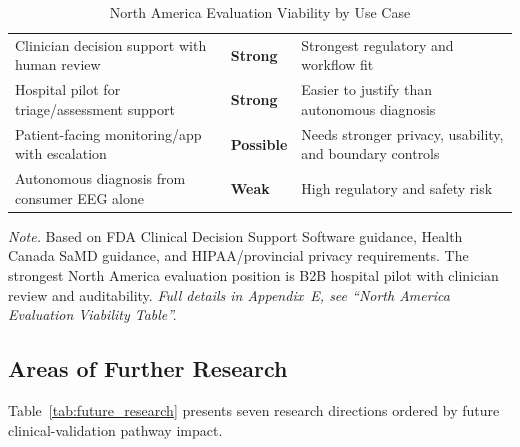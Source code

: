 {\tablestripes\tablefontsize
\begin{xltabular}{\textwidth}{@{} L l L @{}}
\caption[North America Evaluation Viability by Use Case]{North America Evaluation Viability by Use Case}\label{tab:na_deployment_viability} \\
\toprule
{} &  &  \\
\midrule
\endfirsthead
\endhead
\bottomrule
\endlastfoot
Clinician decision support with human review & \textbf{Strong} & Strongest regulatory and workflow fit \\
Hospital pilot for triage/assessment support & \textbf{Strong} & Easier to justify than autonomous diagnosis \\
Patient-facing monitoring/app with escalation & \textbf{Possible} & Needs stronger privacy, usability, and boundary controls \\
Autonomous diagnosis from consumer EEG alone & \textbf{Weak} & High regulatory and safety risk \\
\end{xltabular}}
\vspace{2pt}
\noindent\textit{Note.} Based on FDA Clinical Decision Support Software guidance, Health Canada SaMD guidance, and HIPAA/provincial privacy requirements. The strongest North America evaluation position is B2B hospital pilot with clinician review and auditability.
\fi
\noindent\textit{Full details in Appendix~E, see ``North America Evaluation Viability Table''.}


\subsection{Areas of Further Research}

Table~\ref{tab:future_research} presents seven research directions ordered by future clinical-validation pathway impact.

